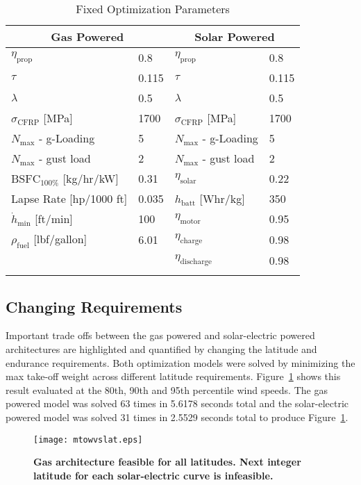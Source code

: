 \begin{longtable}{llll}
\caption{Fixed Optimization Parameters} \\
\toprule
\toprule
\multicolumn{2}{c}{Gas Powered} & \multicolumn{2}{c}{Solar Powered}\\
\midrule
$\eta_{\text{prop}}$         & 0.8  & $\eta_{\text{prop}}$         & 0.8 \\
$\tau$                       & 0.115 & $\tau$                       & 0.115 \\
$\lambda$                    & 0.5  & $\lambda$                    & 0.5 \\
$\sigma_{\text{CFRP}}$ [MPa] & 1700 & $\sigma_{\text{CFRP}}$ [MPa] & 1700  \\
$N_{\text{max}}$ - g-Loading & 5    & $N_{\text{max}}$ - g-Loading & 5 \\
$N_{\text{max}}$ - gust load & 2    & $N_{\text{max}}$ - gust load & 2 \\
$\text{BSFC}_{100\%}$ [kg/hr/kW] & 0.31 & $\eta_{\text{solar}}$      & 0.22 \\
Lapse Rate [hp/1000 ft]      & 0.035 &  $h_{\text{batt}}$ [Whr/kg]   & 350 \\
$\dot{h}_{\text{min}}$ [ft/min] & 100 & $\eta_{\text{motor}}$           & 0.95 \\ 
$\rho_{\text{fuel}} $ [lbf/gallon] & 6.01 & $\eta_{\text{charge}}$          & 0.98 \\
                             &     & $\eta_{\text{discharge}}$       & 0.98 \\
\bottomrule
\label{t:gassolarparams}
 \end{longtable}

\subsection{Changing Requirements}

Important trade offs between the gas powered and solar-electric powered architectures are highlighted and quantified by changing the latitude and endurance requirements.   
Both optimization models were solved by minimizing the max take-off weight across different latitude requirements. 
Figure~\ref{f:latvsmtowtrade} shows this result evaluated at the 80th, 90th and 95th percentile wind speeds.  
The gas powered model was solved 63 times in 5.6178 seconds total and the solar-electric powered model was solved 31 times in 2.5529 seconds total to produce Figure~\ref{f:latvsmtowtrade}.

\begin{figure}[H]
	\begin{center}
	\texttt{[image: mtowvslat.eps]}
    \caption{\textbf{Gas architecture feasible for all latitudes. Next integer latitude for each solar-electric curve is infeasible.}}
    \label{f:latvsmtowtrade}
	\end{center}
\end{figure}

